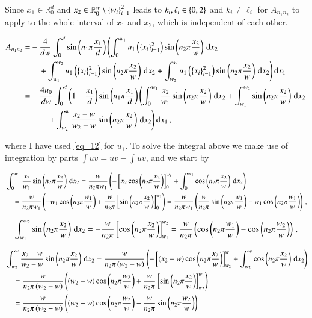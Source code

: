 \documentclass[11pt,english,a4paper]{article}
\begin{document}
\begin{flushleft}
Since $x_1\in\mathbb{R}_0^d$ and $x_2\in\mathbb{R}_0^w\setminus \left\lbrace{w_i}\right\rbrace_{i=1}^2$ leads to $k_i,\ell_i \in \left\lbrace{0,2}\right\rbrace$ and $k_i\neq \ell_i$ for $A_{n_1 n_2}$ to apply to the whole interval of $x_1$ and $x_2$, which is independent of each other.

\begin{align*}
A_{n_1 n_2} =&  -\frac{4}{dw}\int_{0}^{d}\sin\left({n_1\pi\frac{x_1}{d}}\right)\left(\int_{0}^{w_1} u_1\left({\left\lbrace{x_i}\right\rbrace_{i=1}^2}\right)\sin\left({n_2\pi\frac{x_2}{w}}\right)\,\mathrm{d}x_2 \right.
\\
&\quad \left.+ \int_{w_1}^{w_2} u_1\left({\left\lbrace{x_i}\right\rbrace_{i=1}^2}\right)\sin\left({n_2\pi\frac{x_2}{w}}\right)\,\mathrm{d}x_2
+ \int_{w_2}^{w} u_1\left({\left\lbrace{x_i}\right\rbrace_{i=1}^2}\right)\sin\left({n_2\pi\frac{x_2}{w}}\right)\,\mathrm{d}x_2\right)\mathrm{d}x_1 
\\
=& -\frac{4 u_0}{dw}\int_{0}^{d}\left({1-\frac{x_1}{d}}\right)\sin\left({n_1\pi\frac{x_1}{d}}\right)\left(\int_0^{w_1}\frac{x_2}{w_1} \sin\left({n_2\pi\frac{x_2}{w}}\right)\,\mathrm{d}x_2 + \int_{w_1}^{w_2}\sin\left({n_2\pi\frac{x_2}{w}}\right)\,\mathrm{d}x_2 \right.
\\
&\qquad \left. + \int_{w_2}^{w}\frac{x_2-w}{w_2-w}\sin\left({n_2\pi\frac{x_2}{w}}\right)\,\mathrm{d}x_2 \right)\mathrm{d}x_1 \,,
\end{align*}

where I have used \eqref{eq_12} for $u_1$. To solve the integral above we make use of integration by parts $\int u\dot{v} = uv - \int \dot{u}v$, and we start by

\begin{align*}
&\int_0^{w_1}\frac{x_2}{w_1} \sin\left({n_2\pi\frac{x_2}{w}}\right)\,\mathrm{d}x_2 = \frac{w}{n_2\pi w_1}\left({-\left[{x_2\cos\left({n_2 \pi \frac{x_2}{w}}\right)}\right]_0^{w_1} + \int_0^{w_1}\cos\left({n_2 \pi \frac{x_2}{w}}\right)\,\mathrm{d}x_2}\right)
\\
&\quad= \frac{w}{n_2\pi w_1}\left({-w_1\cos\left({n_2 \pi \frac{w_1}{w}}\right) + \frac{w}{n_2\pi}\left[{\sin\left({n_2 \pi \frac{x_2}{w}}\right)}\right]_0^{w_1}}\right)
= \frac{w}{n_2\pi w_1}\left({\frac{w}{n_2\pi}\sin\left({n_2 \pi \frac{w_1}{w}}\right) - w_1\cos\left({n_2 \pi \frac{w_1}{w}}\right)}\right) \,,
\end{align*}

\begin{align*}
\int_{w_1}^{w_2}\sin\left({n_2\pi\frac{x_2}{w}}\right)\,\mathrm{d}x_2 = -\frac{w}{n_2 \pi}\left[{\cos\left({n_2\pi\frac{x_2}{w}}\right)}\right]_{w_1}^{w_2} = \frac{w}{n_2 \pi}\left({\cos\left({n_2\pi\frac{w_1}{w}}\right) - \cos\left({n_2\pi\frac{w_2}{w}}\right)}\right)\,,
\end{align*}

\begin{align*}
&\int_{w_2}^{w}\frac{x_2-w}{w_2-w}\sin\left({n_2\pi\frac{x_2}{w}}\right)\,\mathrm{d}x_2 = \frac{w}{n_2 \pi\left({w_2-w}\right)}\left({-\left[{\left({x_2-w}\right)\cos\left({n_2\pi\frac{x_2}{w}}\right)}\right]_{w_2}^w + \int_{w_2}^w \cos\left({n_2\pi\frac{x_2}{w}}\right)\,\mathrm{d}x_2}\right)
\\
&\quad = \frac{w}{n_2 \pi\left({w_2-w}\right)}\left({\left({w_2-w}\right)\cos\left({n_2\pi\frac{w_2}{w}}\right) + \frac{w}{n_2 \pi}\left[{ \sin\left({n_2\pi\frac{x_2}{w}}\right)}\right]_{w_2}^w}\right)
\\
&\quad = \frac{w}{n_2 \pi\left({w_2-w}\right)}\left({\left({w_2-w}\right)\cos\left({n_2\pi\frac{w_2}{w}}\right) - \frac{w}{n_2 \pi} \sin\left({n_2\pi\frac{w_2}{w}}\right)}\right)
\end{align*}


\end{flushleft}
\end{document}
